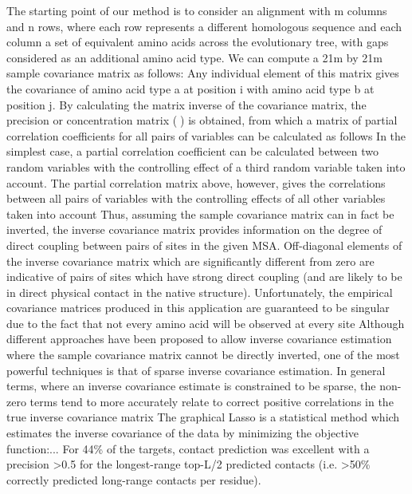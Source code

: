 The starting point of our method is to consider an alignment with m columns and n rows, \cite{jones2012psicov}
where each row represents a different homologous sequence and each column a set of equivalent amino acids across the evolutionary tree, with gaps considered as an additional amino acid type. We can compute a 21m by 21m sample covariance matrix as follows: \cite{jones2012psicov}
Any individual element of this matrix gives the covariance of amino acid type a at position i with amino acid type b at position j. \cite{jones2012psicov}
By calculating the matrix inverse of the covariance matrix, the precision or concentration matrix (􏰩) is obtained, from which a matrix of partial correlation coefficients for all pairs of variables can be calculated as follows \cite{jones2012psicov}
In the simplest case, a partial correlation coefficient can be calculated between two random variables with the controlling effect of a third random variable taken into account. The partial correlation matrix above, however, gives the correlations between all pairs of variables with the controlling effects of all other variables taken into account  \cite{jones2012psicov}
Thus, assuming the sample covariance matrix can in fact be inverted, the inverse covariance matrix provides information on the degree of direct coupling between pairs of sites in the given MSA. Off-diagonal elements of the inverse covariance matrix which are significantly different from zero are indicative of pairs of sites which have strong direct coupling (and are likely to be in direct physical contact in the native structure). \cite{jones2012psicov}
Unfortunately, the empirical covariance matrices produced in this application are guaranteed to be singular due to the fact that not every amino acid will be observed at every site \cite{jones2012psicov}
Although different approaches have been proposed to allow inverse covariance estimation where the sample covariance matrix cannot be directly inverted, one of the most powerful techniques is that of sparse inverse covariance estimation. \cite{jones2012psicov}
In general terms, where an inverse covariance estimate is constrained to be sparse, the non-zero terms tend to more accurately relate to correct positive correlations in the true inverse covariance matrix \cite{jones2012psicov}
The graphical Lasso is a statistical method which estimates the inverse covariance of the data by minimizing the objective function:... \cite{jones2012psicov}
For 44\% of the targets, contact prediction was excellent with a precision >0.5 for the longest-range top-L/2 predicted contacts (i.e. >50\% correctly predicted long-range contacts per residue).  \cite{jones2012psicov}


